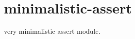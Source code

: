 \chapter{minimalistic-\/assert}
\hypertarget{md_pkiclassroomrescheduler_2src_2main_2frontend_2node__modules_2minimalistic-assert_2readme}{}\label{md_pkiclassroomrescheduler_2src_2main_2frontend_2node__modules_2minimalistic-assert_2readme}
very minimalistic assert module. 